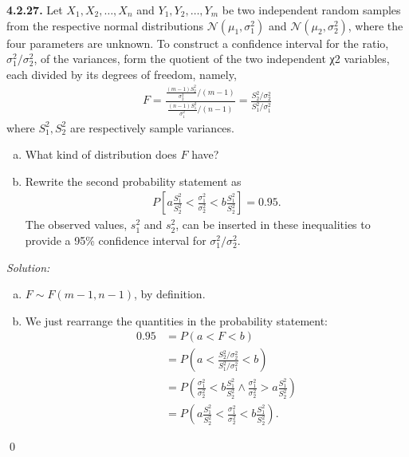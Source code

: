 \documentclass{book}
\theoremstyle{definition}
\newcommand{\nn}{\nonumber}
\newcommand{\N}{\mathcal{N}}
\newcommand{\f}[2]{\frac{#1}{#2}}
\newcommand{\lp}{\left(}
\newcommand{\rp}{\right)}
\newcommand{\lb}{\left[}
\newcommand{\rb}{\right]}
\begin{document}
\newpage
\noindent\textbf{4.2.27.} Let $X_1, X_2,\dots,X_n$ and $Y_1, Y_2,\dots,Y_m$ be two independent random samples
from the respective normal distributions $\N(\mu_1, \sigma^2_1)$ and $\N(\mu_2, \sigma^2_2)$, where the four
parameters are unknown. To construct a confidence interval for the ratio, $\sigma^2_1/\sigma^2_2$, of
the variances, form the quotient of the two independent χ2 variables, each divided
by its degrees of freedom, namely,
\begin{align}
F = \f{\f{(m-1)S_2^2}{\sigma^2_2}/(m-1)}{\f{(n-1)S_1^2}{\sigma^2_1}/(n-1)} = \f{S_2^2/\sigma_2^2}{S_1^2/\sigma_1^2}
\end{align}
where $S_1^2, S_2^2$ are respectively sample variances. 

\begin{enumerate}[(a)]
	\item What kind of distribution does $F$ have?
	\item Rewrite the second probability statement as
	\begin{align}
	P \lb a\f{S_1^2}{S_2^2} < \f{\sigma_1^2}{\sigma_2^2} < b \f{S_1^2}{S^2_2} \rb = 0.95.
	\end{align}
	The observed values, $s^2_1$ and $s_2^2$, can be inserted in these inequalities to provide
	a 95\% confidence interval for $\sigma^2_1/σ^2_2$. 
\end{enumerate}


\noindent \textit{Solution:} 
\begin{enumerate}[(a)]
	\item $F\sim F(m-1,n-1)$, by definition. 
	\item We just rearrange the quantities in the probability statement:
	\begin{align}
	0.95 &= P(a<F<b) \nn\\
	&= P\lp a < \f{S_2^2/\sigma_2^2}{S_1^2/\sigma_1^2} < b  \rp\nn\\
	&= P\lp \f{\sigma_1^2}{\sigma_2^2} < b\f{S_1^2}{S_2^2} \land \f{\sigma_1^2}{\sigma_2^2} > a \f{S_1^2}{S_2^2}  \rp\nn\\
	&= P\lp   a \f{S_1^2}{S_2^2} <  \f{\sigma_1^2}{\sigma_2^2}  < b \f{S_1^2}{S_2^2} \rp.
	\end{align}
\end{enumerate}\qed
\end{document}
